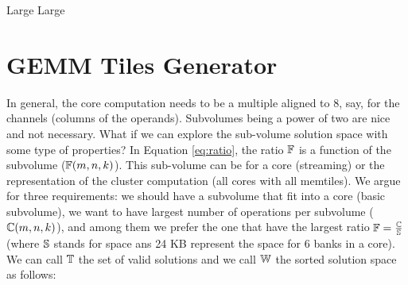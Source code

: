 \documentclass[conference]{IEEEtran}
\begin{document}
\begin{algorithm}
  \caption{Large Large}
  \label{alg:one2}
  \begin{algorithmic}[1]
      \ENDFOR
    \ENDFOR
  \end{algorithmic}  
\end{algorithm}

\newpage 
\section{GEMM Tiles Generator}
In general, the core computation needs to be a multiple aligned to
$8$, say, for the channels (columns of the operands). Subvolumes being
a power of two are nice and not necessary. What if we can explore the
sub-volume solution space with some type of properties? In Equation
\ref{eq:ratio}, the ratio $\mathbb{F}$ is a function of the subvolume
($\mathbb{F}(m,n,k)$). This sub-volume can be for a core (streaming) or the
representation of the cluster computation (all cores with all
memtiles). We argue for three requirements: we should have a subvolume
that fit into a core (basic subvolume), we want to have largest number
of operations per subvolume ($\mathbb{C}(m,n,k)$), and among them we prefer
the one that have the largest ratio $\mathbb{F} = \frac{\mathbb{C}}{\mathbb{S}}$ (where $\mathbb{S}$
stands for space ans 24 KB represent the space for 6 banks in a
core). We can call $\mathbb{T}$ the set of valid solutions and we call $\mathbb{W}$
the sorted solution space as follows:
\end{document}
